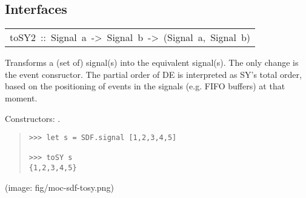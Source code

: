 \subsection{Interfaces}
\begin{haddockdesc}
\item[\begin{tabular}{@{}l}
toSY2\ ::\ Signal\ a\ ->\ Signal\ b\ ->\ (Signal\ a,\ Signal\ b)
\end{tabular}]\haddockbegindoc
Transforms a (set of)  signal(s) into
 the equivalent  signal(s). The only change
 is the event consructor. The partial order of DE is interpreted as
 SY's total order, based on the positioning of events in the signals
 (e.g. FIFO buffers) at that moment.\par
Constructors: .\par
\begin{quote}
{\haddockverb\begin{verbatim}
>>> let s = SDF.signal [1,2,3,4,5]

>>> toSY s
{1,2,3,4,5}

\end{verbatim}}
\end{quote}(image: fig/moc-sdf-tosy.png)\par
           
\end{haddockdesc}

